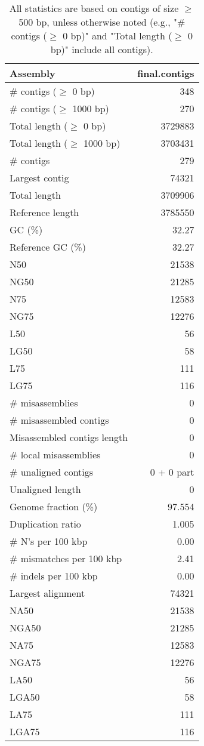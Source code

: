 \documentclass[12pt,a4paper]{article}
\begin{document}
\begin{table}[ht]
\begin{center}
\caption{All statistics are based on contigs of size $\geq$ 500 bp, unless otherwise noted (e.g., "\# contigs ($\geq$ 0 bp)" and "Total length ($\geq$ 0 bp)" include all contigs).}
\begin{tabular}{|l*{1}{|r}|}
\hline
Assembly & final.contigs \\ \hline
\# contigs ($\geq$ 0 bp) & 348 \\ \hline
\# contigs ($\geq$ 1000 bp) & 270 \\ \hline
Total length ($\geq$ 0 bp) & 3729883 \\ \hline
Total length ($\geq$ 1000 bp) & 3703431 \\ \hline
\# contigs & 279 \\ \hline
Largest contig & 74321 \\ \hline
Total length & 3709906 \\ \hline
Reference length & 3785550 \\ \hline
GC (\%) & 32.27 \\ \hline
Reference GC (\%) & 32.27 \\ \hline
N50 & 21538 \\ \hline
NG50 & 21285 \\ \hline
N75 & 12583 \\ \hline
NG75 & 12276 \\ \hline
L50 & 56 \\ \hline
LG50 & 58 \\ \hline
L75 & 111 \\ \hline
LG75 & 116 \\ \hline
\# misassemblies & 0 \\ \hline
\# misassembled contigs & 0 \\ \hline
Misassembled contigs length & 0 \\ \hline
\# local misassemblies & 0 \\ \hline
\# unaligned contigs & 0 + 0 part \\ \hline
Unaligned length & 0 \\ \hline
Genome fraction (\%) & 97.554 \\ \hline
Duplication ratio & 1.005 \\ \hline
\# N's per 100 kbp & 0.00 \\ \hline
\# mismatches per 100 kbp & 2.41 \\ \hline
\# indels per 100 kbp & 0.00 \\ \hline
Largest alignment & 74321 \\ \hline
NA50 & 21538 \\ \hline
NGA50 & 21285 \\ \hline
NA75 & 12583 \\ \hline
NGA75 & 12276 \\ \hline
LA50 & 56 \\ \hline
LGA50 & 58 \\ \hline
LA75 & 111 \\ \hline
LGA75 & 116 \\ \hline
\end{tabular}
\end{center}
\end{table}
\end{document}
